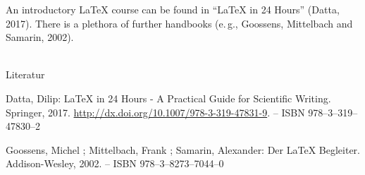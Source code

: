 An introductory \LaTeX{} course can be found in \enquote{\LaTeX{} in 24 Hours} (Datta, 2017).
There is a plethora of further handbooks (e.\,g., Goossens, Mittelbach and Samarin, 2002).

~\\

\noindent Literatur

\noindent [Datta 2017] Datta, Dilip: LaTeX in 24 Hours - A Practical Guide for Scientific Writing. Springer, 2017. \url{http://dx.doi.org/10.1007/978-3-319-47831-9}. – ISBN 978–3–319–47830–2

\noindent [Goossens u. a. 2002] Goossens, Michel ; Mittelbach, Frank ; Samarin, Alexander: Der LaTeX Begleiter. Addison-Wesley, 2002. – ISBN 978–3–8273–7044–0
